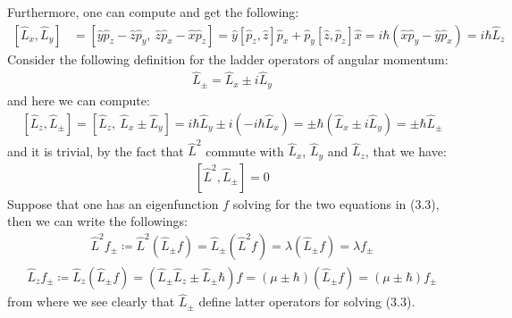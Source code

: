 \documentclass[11pt]{book}
\theoremstyle{break}
\theoremstyle{break}
\begin{document}
Furthermore, one can compute and get the following:
\begin{align*}
\left[\hat{L}_x, \hat{L}_y \right] 
&= \left[\hat{y}\hat{p}_z - \hat{z}\hat{p}_y, \ \hat{z}\hat{p}_x - \hat{x}\hat{p}_z \right]= \hat{y}\left[ \hat{p}_z , \hat{z}\right]\hat{p}_x + \hat{p}_y \left[ \hat{z}, \hat{p}_z\right]\hat{x} = i\hbar \left( \hat{x}\hat{p}_y - \hat{y}\hat{p}_x\right) = i\hbar \hat{L}_z
\end{align*}
Consider the following definition for the ladder operators of angular momentum:
\begin{align*}
\hat{L}_{\pm} = \hat{L}_x \pm i \hat{L}_y
\end{align*}
and here we can compute:
\begin{align*}
\left[\hat{L}_z,\hat{L}_{\pm} \right] = \left[ \hat{L}_z,\ \hat{L}_x \pm \hat{L}_{y}\right] = i\hbar \hat{L}_y \pm i \left( -i\hbar \hat{L}_x\right) = \pm \hbar \left( \hat{L}_x \pm i \hat{L}_y\right) = \pm \hbar \hat{L}_{\pm}
\end{align*}
and it is trivial, by the fact that $\hat{L}^2$ commute with $\hat{L}_x$, $\hat{L}_y$ and $\hat{L}_z$, that we have:
\begin{align*}
\left[\hat{L}^2, \hat{L}_{\pm}\right] = 0
\end{align*}
Suppose that one has an eigenfunction $f$ solving for the two equations in (3.3), then we can write the followings:
\begin{align*}
\hat{L}^2f_{\pm} \coloneqq \hat{L}^2 \left( \hat{L}_{\pm}f\right) = \hat{L}_{\pm}\left( \hat{L}^2 f\right)  = \lambda \left(\hat{L}_{\pm}f\right) = \lambda f_{\pm}
\end{align*}
\begin{align*}
\hat{L}_z f_{\pm}\coloneqq \hat{L}_z\left( \hat{L}_{\pm}f\right)  = \left( \hat{L}_{\pm}\hat{L}_z \pm \hat{L}_{\pm}\hbar\right) f = \left( \mu \pm \hbar \right)\left( \hat{L}_{\pm}f\right)  = (\mu \pm \hbar) f_{\pm}
\end{align*}
from where we see clearly that $\hat{L}_{\pm}$ define latter operators for solving (3.3). \\
\end{document}
